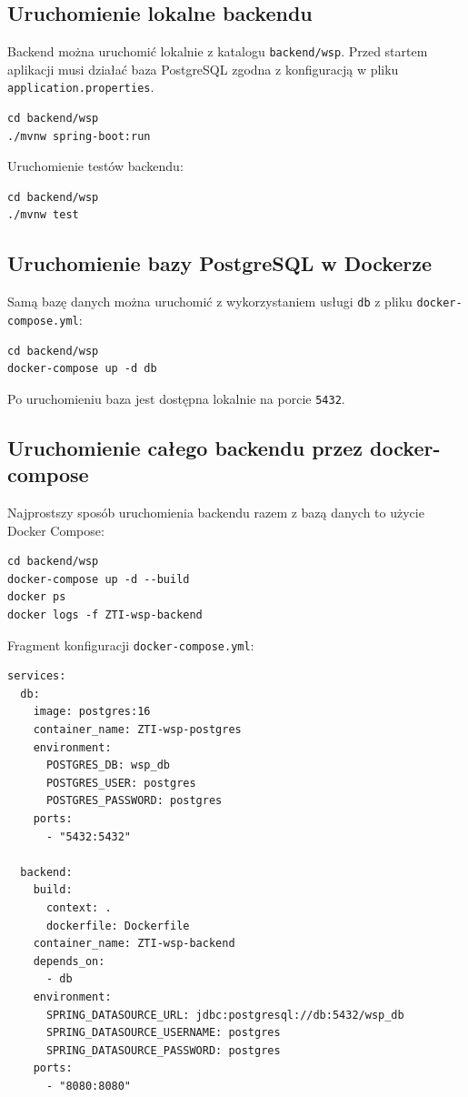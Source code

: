 \documentclass[12pt,a4paper]{article}
\begin{document}
\subsection{Uruchomienie lokalne backendu}

Backend można uruchomić lokalnie z katalogu \texttt{backend/wsp}. Przed startem aplikacji musi działać baza PostgreSQL zgodna z konfiguracją w pliku \texttt{application.properties}.

\begin{lstlisting}[style=terminal]
cd backend/wsp
./mvnw spring-boot:run
\end{lstlisting}

Uruchomienie testów backendu:

\begin{lstlisting}[style=terminal]
cd backend/wsp
./mvnw test
\end{lstlisting}

\subsection{Uruchomienie bazy PostgreSQL w Dockerze}

Samą bazę danych można uruchomić z wykorzystaniem usługi \texttt{db} z pliku \texttt{docker-\allowbreak compose.yml}:

\begin{lstlisting}[style=terminal]
cd backend/wsp
docker-compose up -d db
\end{lstlisting}

Po uruchomieniu baza jest dostępna lokalnie na porcie \texttt{5432}.

\subsection{Uruchomienie całego backendu przez docker-compose}

Najprostszy sposób uruchomienia backendu razem z bazą danych to użycie Docker Compose:

\begin{lstlisting}[style=terminal]
cd backend/wsp
docker-compose up -d --build
docker ps
docker logs -f ZTI-wsp-backend
\end{lstlisting}

Fragment konfiguracji \texttt{docker-compose.yml}:

\begin{lstlisting}[style=yaml]
services:
  db:
    image: postgres:16
    container_name: ZTI-wsp-postgres
    environment:
      POSTGRES_DB: wsp_db
      POSTGRES_USER: postgres
      POSTGRES_PASSWORD: postgres
    ports:
      - "5432:5432"

  backend:
    build:
      context: .
      dockerfile: Dockerfile
    container_name: ZTI-wsp-backend
    depends_on:
      - db
    environment:
      SPRING_DATASOURCE_URL: jdbc:postgresql://db:5432/wsp_db
      SPRING_DATASOURCE_USERNAME: postgres
      SPRING_DATASOURCE_PASSWORD: postgres
    ports:
      - "8080:8080"
\end{lstlisting}
\end{document}
